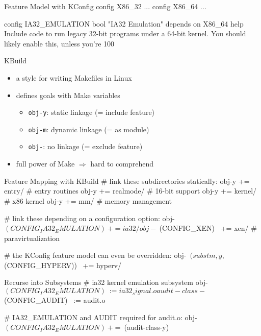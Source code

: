 \begin{frame}[fragile]{\myframetitle}
	\begin{fancycolumns}
		\begin{kconfigtight}[basicstyle=\footnotesize]{Feature Model with KConfig}
config X86_32 ...
config X86_64 ...

config IA32_EMULATION
	bool "IA32 Emulation"
	depends on X86_64
	help Include code to run legacy 32-bit programs under a 64-bit kernel. You should likely enable this, unless you're 100%
\end{kconfigtight}
		\begin{definition}{KBuild}
			\begin{itemize}
				\item a style for writing Makefiles in Linux
				\item defines goals with Make variables
				\begin{itemize}
					\item \texttt{obj-y}: static linkage (= include feature)
					\item \texttt{obj-m}: dynamic linkage (= as module)
					\item \texttt{obj-}: no linkage (= exclude feature)
				\end{itemize}
				\item full power of Make $\Rightarrow$ hard to comprehend
			\end{itemize}
		\end{definition}
	\nextcolumn
		\begin{kbuildtight}[basicstyle=\small]{Feature Mapping with KBuild }
# link these subdirectories statically:
obj-y += entry/ # entry routines
obj-y += realmode/ # 16-bit support
obj-y += kernel/ # x86 kernel
obj-y += mm/ # memory management

# link these depending on a configuration option:
obj-~$(CONFIG_IA32_EMULATION)~ += ia32/
obj-~$(CONFIG_XEN)~ += xen/ # paravirtualization

# the KConfig feature model can even be overridden:
obj-~$(subst m,y,$(CONFIG_HYPERV))~ += hyperv/
		\end{kbuildtight}

		\begin{kbuildtight}[basicstyle=\small]{Recurse into Subsystems}
# ia32 kernel emulation subsystem
obj-~$(CONFIG_IA32_EMULATION)~ := ia32_signal.o
audit-class-~$(CONFIG_AUDIT)~ := audit.o

# IA32_EMULATION and AUDIT required for audit.o:
obj-~$(CONFIG_IA32_EMULATION)~ += ~$(audit-class-y)~
		\end{kbuildtight}
	\end{fancycolumns}
\end{frame}

